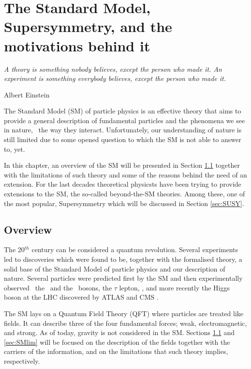\chapter{The Standard Model, Supersymmetry, and the motivations behind it}
\label{ch:theory} 
\epigraph{\emph{A theory is something nobody believes, except the person who made it. An experiment is something everybody believes, except the person who made it.}} {Albert Einstein}

	The Standard Model (SM) of particle physics is an effective theory that aims to provide a general description of fundamental particles and the phenomena we see in nature, \ie\ the way they interact. Unfortunately, our understanding of nature is still limited due to some opened question to which the SM is not able to answer to, yet. 

	In this chapter, an overview of the SM will be presented in Section \ref{sec:SMov} together with the limitations of such theory and some of the reasons behind the need of an extension. For the last decades theoretical physicsts have been trying to provide extensions to the SM, the so-called beyond-the-SM theories. Among these, one of the most popular, Supersymmetry which will be discussed in Section \ref{sec:SUSY}.  

	
	


	\section{Overview}
	\label{sec:SMov}

		The 20$^{th}$ century can be considered a quantum revolution. Several experiments led to discoveries which were found to be, together with the formalised theory, a solid base of the Standard Model of particle physics and our description of nature. Several particles were predicted first by the SM and then experimentally observed \eg\ the \Wboson\ and the \Zboson\ bosons, the $\tau$ lepton, \cite{Herrero1998}, and more recently the Higgs boson at the LHC discovered by ATLAS \cite{ATLASHiggs2012} and CMS \cite{CMSHiggs2012}.

		The SM lays on a Quantum Field Theory (QFT) where particles are treated like fields. It can describe three of the four fundamental forces; weak, electromagnetic, and strong. As of today, gravity is not considered in the SM. Sections \ref{sec:SMov} and \ref{sec:SMlim} will be focused on the description of the fields together with the carriers of the information, and on the limitations that such theory implies, respectively.


